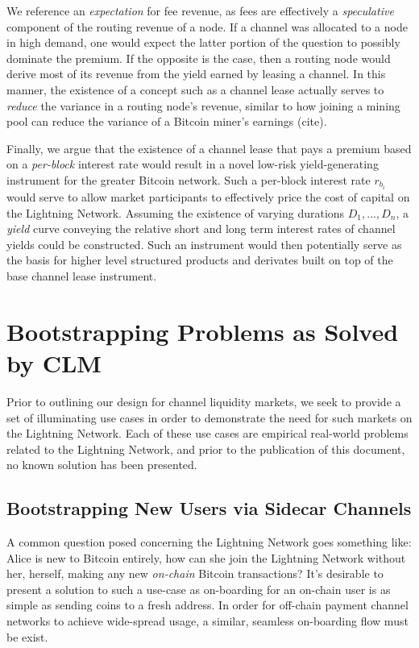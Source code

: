 \documentclass[10pt,a4paper]{article}
\theoremstyle{definition}
\begin{document}
We reference an \emph{expectation} for fee revenue, as fees are effectively a
\emph{speculative} component of the routing revenue of a node. If a channel was
allocated to a node in high demand, one would expect the latter portion of the
question to possibly dominate the premium. If the opposite is the case, then a
routing node would derive most of its revenue from the yield earned by leasing
a channel. In this manner, the existence of a concept such as a channel lease
actually serves to \emph{reduce} the variance in a routing node's revenue,
similar to how joining a mining pool can reduce the variance of a Bitcoin miner's
earnings (cite). 

Finally, we argue that the existence of a channel lease that pays a premium
based on a \emph{per-block} interest rate would result in a novel low-risk
yield-generating instrument for the greater Bitcoin network. Such a per-block
interest rate $r_{b_i}$ would serve to allow market participants to effectively
price the cost of capital on the Lightning Network. Assuming the existence of
varying durations ${D_1, ..., D_n}$, a \emph{yield} curve conveying the relative
short and long term interest rates of channel yields could be constructed. Such
an instrument would then potentially serve as the basis for higher level
structured products and derivates built on top of the base channel lease
instrument. 


\section{Bootstrapping Problems as Solved by CLM}

Prior to outlining our design for channel liquidity markets, we seek to provide
a set of illuminating use cases in order to demonstrate the need for such
markets on the Lightning Network. Each of these use cases are empirical
real-world problems related to the Lightning Network, and prior to the
publication of this document, no known solution has been presented. 

\subsection{Bootstrapping New Users via Sidecar Channels}

A common question posed concerning the Lightning Network goes something like:
Alice is new to Bitcoin entirely, how can she join the Lightning Network
without her, herself, making any new \emph{on-chain} Bitcoin transactions? It's
desirable to present a solution to such a use-case as on-boarding for an on-chain
user is as simple as sending coins to a fresh address. In order for
off-chain payment channel networks to achieve wide-spread usage, a similar,
seamless on-boarding flow must be exist.
\end{document}
